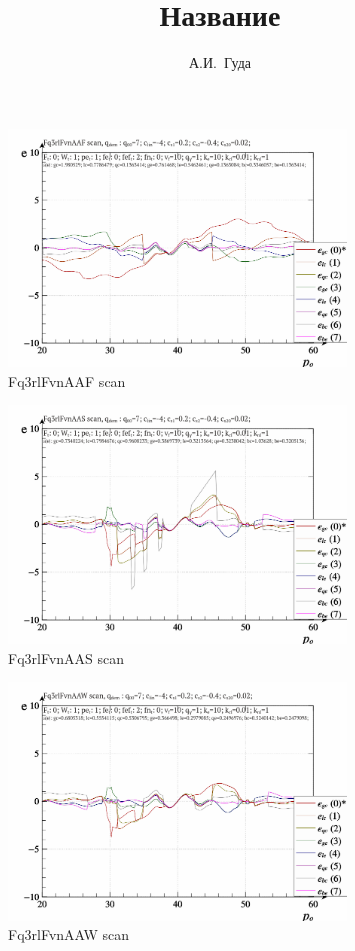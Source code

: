 \documentclass[a4paper,10pt]{article}
\title{Название}
\author{А.И.~Гуда}
\begin{document}
\begin{figure}[htb!]
  \centerline{
    \includegraphics[width=0.8\textwidth]{qls-p_p_e_Fq3rlFvnAAF_scan.png}
  }
  \caption{Fq3rlFvnAAF scan}
  \label{atu:f:Fq3rlFvnAAF_scan}
\end{figure}

\begin{figure}[htb!]
  \centerline{
    \includegraphics[width=0.8\textwidth]{qls-p_p_e_Fq3rlFvnAAS_scan.png}
  }
  \caption{Fq3rlFvnAAS scan}
  \label{atu:f:Fq3rlFvnAAS_scan}
\end{figure}

\begin{figure}[htb!]
  \centerline{
    \includegraphics[width=0.8\textwidth]{qls-p_p_e_Fq3rlFvnAAW_scan.png}
  }
  \caption{Fq3rlFvnAAW scan}
  \label{atu:f:Fq3rlFvnAAW_scan}
\end{figure}
\end{document}
